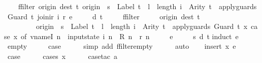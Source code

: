 \begin{isabellebody}
\ \ \ \ ffilter\ {\isacharparenleft}{\isasymlambda}{\isacharparenleft}{\isacharparenleft}origin{\isacharcomma}\ dest{\isacharparenright}{\isacharcomma}\ t{\isacharparenright}{\isachardot}\ origin\ {\isacharequal}\ s\ {\isasymand}\ Label\ t\ {\isacharequal}\ l\ {\isasymand}\ length\ i\ {\isacharequal}\ Arity\ t\ {\isasymand}\ apply{\isacharunderscore}guards\ {\isacharparenleft}Guard\ t{\isacharparenright}\ {\isacharparenleft}join{\isacharunderscore}ir\ i\ r{\isacharparenright}{\isacharparenright}\ e\ {\isacharequal}\isanewline
\ \ \ \ {\isacharbraceleft}{\isacharbar}{\isacharparenleft}d{\isacharcomma}\ t{\isacharparenright}{\isacharbar}{\isacharbraceright}\ {\isasymLongrightarrow}\isanewline
\ \ \ \ ffilter\isanewline
\ \ \ \ \ {\isacharparenleft}{\isasymlambda}{\isacharparenleft}{\isacharparenleft}origin{\isacharcomma}\ dest{\isacharparenright}{\isacharcomma}\ t{\isacharparenright}{\isachardot}\isanewline
\ \ \ \ \ \ \ \ \ origin\ {\isacharequal}\ s\ {\isasymand}\ Label\ t\ {\isacharequal}\ l\ {\isasymand}\ length\ i\ {\isacharequal}\ Arity\ t\ {\isasymand}\ apply{\isacharunderscore}guards\ {\isacharparenleft}Guard\ t{\isacharparenright}\ {\isacharparenleft}{\isasymlambda}x{\isachardot}\ case\ x\ of\ vname{\isachardot}I\ n\ {\isasymRightarrow}\ input{}state\ i\ n\ {\isacharbar}\ R\ n\ {\isasymRightarrow}\ r\ n{\isacharparenright}{\isacharparenright}\isanewline
\ \ \ \ \ e\ {\isacharequal}\isanewline
\ \ \ \ {\isacharbraceleft}{\isacharbar}{\isacharparenleft}{\isacharparenleft}s{\isacharcomma}\ d{\isacharparenright}{\isacharcomma}\ t{\isacharparenright}{\isacharbar}{\isacharbraceright}{\isachardoublequoteclose}\isanewline
%
\isadelimproof
%
\endisadelimproof
%
\isatagproof
{}\isamarkupfalse%
{\isacharparenleft}induct\ e{\isacharparenright}\isanewline
\ \ \isamarkupfalse%
\ empty\isanewline
\ \ \isamarkupfalse%
\ \isamarkupfalse%
\ {\isacharquery}case\isanewline
\ \ \ \ \isamarkupfalse%
\ {\isacharparenleft}simp\ add{\isacharcolon}\ ffilter{\isacharunderscore}empty{\isacharparenright}\isanewline
\ \ \ \ \isamarkupfalse%
\ auto\isanewline
{}\isamarkupfalse%
\isanewline
\ \ \isamarkupfalse%
\ {\isacharparenleft}insert\ x\ e{\isacharparenright}\isanewline
\ \ \isamarkupfalse%
\ \isamarkupfalse%
\ {\isacharquery}case\isanewline
\ \ \ \ \isamarkupfalse%
\ {\isacharparenleft}cases\ x{\isacharparenright}\isanewline
\ \ \ \ \isamarkupfalse%
\ {\isacharparenleft}case{\isacharunderscore}tac\ a{\isacharparenright}\isanewline

\end{isabellebody}
